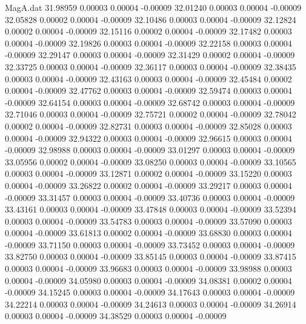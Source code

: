 \begin{filecontents}{MagA.dat}
  31.98959    0.00003    0.00004   -0.00009
  32.01240    0.00003    0.00004   -0.00009
  32.05828    0.00002    0.00004   -0.00009
  32.10486    0.00003    0.00004   -0.00009
  32.12824    0.00002    0.00004   -0.00009
  32.15116    0.00002    0.00004   -0.00009
  32.17482    0.00003    0.00004   -0.00009
  32.19826    0.00003    0.00004   -0.00009
  32.22158    0.00003    0.00004   -0.00009
  32.29147    0.00003    0.00004   -0.00009
  32.31429    0.00002    0.00004   -0.00009
  32.33725    0.00003    0.00004   -0.00009
  32.36117    0.00003    0.00004   -0.00009
  32.38435    0.00003    0.00004   -0.00009
  32.43163    0.00003    0.00004   -0.00009
  32.45484    0.00002    0.00004   -0.00009
  32.47762    0.00003    0.00004   -0.00009
  32.59474    0.00003    0.00004   -0.00009
  32.64154    0.00003    0.00004   -0.00009
  32.68742    0.00003    0.00004   -0.00009
  32.71046    0.00003    0.00004   -0.00009
  32.75721    0.00002    0.00004   -0.00009
  32.78042    0.00002    0.00004   -0.00009
  32.82731    0.00003    0.00004   -0.00009
  32.85028    0.00003    0.00004   -0.00009
  32.94322    0.00003    0.00004   -0.00009
  32.96615    0.00003    0.00004   -0.00009
  32.98988    0.00003    0.00004   -0.00009
  33.01297    0.00003    0.00004   -0.00009
  33.05956    0.00002    0.00004   -0.00009
  33.08250    0.00003    0.00004   -0.00009
  33.10565    0.00003    0.00004   -0.00009
  33.12871    0.00002    0.00004   -0.00009
  33.15220    0.00003    0.00004   -0.00009
  33.26822    0.00002    0.00004   -0.00009
  33.29217    0.00003    0.00004   -0.00009
  33.31457    0.00003    0.00004   -0.00009
  33.40736    0.00003    0.00004   -0.00009
  33.43161    0.00003    0.00004   -0.00009
  33.47848    0.00003    0.00004   -0.00009
  33.52394    0.00003    0.00004   -0.00009
  33.54783    0.00003    0.00004   -0.00009
  33.57090    0.00003    0.00004   -0.00009
  33.61813    0.00002    0.00004   -0.00009
  33.68830    0.00003    0.00004   -0.00009
  33.71150    0.00003    0.00004   -0.00009
  33.73452    0.00003    0.00004   -0.00009
  33.82750    0.00003    0.00004   -0.00009
  33.85145    0.00003    0.00004   -0.00009
  33.87415    0.00003    0.00004   -0.00009
  33.96683    0.00003    0.00004   -0.00009
  33.98988    0.00003    0.00004   -0.00009
  34.05980    0.00003    0.00004   -0.00009
  34.08381    0.00002    0.00004   -0.00009
  34.15245    0.00003    0.00004   -0.00009
  34.17643    0.00003    0.00004   -0.00009
  34.22214    0.00003    0.00004   -0.00009
  34.24613    0.00003    0.00004   -0.00009
  34.26914    0.00003    0.00004   -0.00009
  34.38529    0.00003    0.00004   -0.00009

\end{filecontents}
